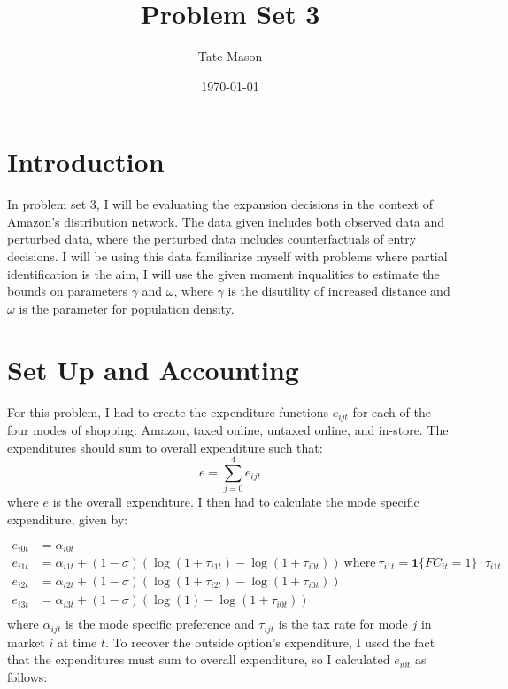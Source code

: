 \documentclass[11pt]{article}
\title{Problem Set 3}
\author{Tate Mason}
\date{\today}
\theoremstyle{definition}
\theoremstyle{remark}
\begin{document}
\maketitle
\thispagestyle{empty}


\newpage
\setcounter{page}{1}

\section{Introduction}

In problem set 3, I will be evaluating the expansion decisions in the context of Amazon's distribution network. The data given includes both observed data and perturbed data, where the perturbed data includes counterfactuals of entry decisions. I will be using this data familiarize myself with problems where partial identification is the aim, I will use the given moment inqualities to estimate the bounds on parameters $\gamma$ and $\omega$, where $\gamma$ is the disutility of increased distance and $\omega$ is the parameter for population density. 


\section{Set Up and Accounting}

For this problem, I had to create the expenditure functions $e_{ijt}$ for each of the four modes of shopping: Amazon, taxed online, untaxed online, and in-store. The expenditures should sum to overall expenditure such that:
\begin{equation}
  e = \sum_{j=0}^4 e_{ijt}
\end{equation}
where $e$ is the overall expenditure. I then had to calculate the mode specific expenditure, given by:

\begin{align*}
  e_{i0t} &= \alpha_{i0t} \\
  e_{i1t} &= \alpha_{i1t} + (1-\sigma)(\log(1+\tau_{i1t}) - \log(1+\tau_{i0t}))
  \ \text{where} \ \tau_{i1t} = \mathbf{1}\{FC_{it} = 1\} \cdot \tau_{i1t} \\
  e_{i2t} &= \alpha_{i2t} + (1-\sigma)(\log(1+\tau_{i2t}) - \log(1+\tau_{i0t})) \\
  e_{i3t} &= \alpha_{i3t} + (1-\sigma)(\log(1) - \log(1+\tau_{i0t})) \\
\end{align*}
where $\alpha_{ijt}$ is the mode specific preference and $\tau_{ijt}$ is the tax rate for mode $j$ in market $i$ at time $t$. To recover the outside option's expenditure, I used the fact that the expenditures must sum to overall expenditure, so I calculated $e_{i0t}$ as follows:
\end{document}
